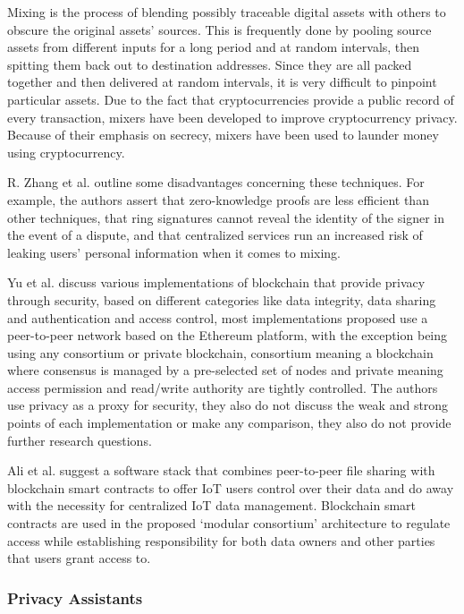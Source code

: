 Mixing is the process of blending possibly traceable digital assets
with others to obscure the original assets' sources. This is frequently done
by pooling source assets from different inputs for a long period and at random
intervals, then spitting them back out to destination addresses. Since they
are all packed together and then delivered at random intervals, it is very
difficult to pinpoint particular assets. Due to the fact that cryptocurrencies
provide a public record of every transaction, mixers have been developed
to improve cryptocurrency privacy. Because of their emphasis on secrecy,
mixers have been used to launder money using cryptocurrency.

R. Zhang et al. \cite{zhang2019security} outline some disadvantages concerning
these techniques. For example, the authors assert that zero-knowledge proofs
are less efficient than other techniques, that ring signatures cannot reveal
the identity of the signer in the event of a dispute, and that centralized
services run an increased risk of leaking users' personal information when
it comes to mixing.

Yu et al. \cite{yu2018blockchain} discuss various implementations of blockchain
that provide privacy through security, based on different categories like
data integrity, data sharing and authentication and access control, most
implementations proposed use a peer-to-peer network based on the Ethereum
platform, with the exception being using any consortium or private blockchain,
consortium meaning a blockchain where consensus is managed by a pre-selected set
of nodes and private meaning access permission and read/write authority are
tightly controlled. The authors use privacy as a proxy for security, they also
do not discuss the weak and strong points of each implementation or make any
comparison, they also do not provide further research questions.

Ali et al. \cite{AliIoT} suggest a software stack that combines peer-to-peer
file sharing with blockchain smart contracts to offer IoT users control
over their data and do away with the necessity for centralized IoT data
management. Blockchain smart contracts are used in the proposed `modular
consortium' architecture to regulate access while establishing responsibility
for both data owners and other parties that users grant access to.

\subsubsection{Privacy Assistants}

